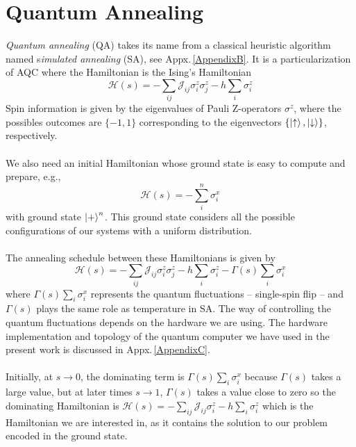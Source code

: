 \section{Quantum Annealing}
\textit{Quantum annealing} (QA) takes its name from a classical heuristic algorithm named s\textit{imulated annealing} (SA), see Appx.\,\ref{AppendixB}. It is a particularization of AQC where the Hamiltonian is the Ising's Hamiltonian
\begin{equation}
    \mathcal{H}(s) = -\sum_{ij}\mathcal{J}_{ij}\sigma_{i}^{z}\sigma_{j}^{z} - h\sum_{i}\sigma_{i}^{z}
\end{equation}
Spin information is given by the eigenvalues of Pauli Z-operators $\sigma^{z}$, where the possibles outcomes are $\{-1,1\}$ corresponding to the eigenvectors $\{\ket{\uparrow},\ket{\downarrow}\}$, respectively.\\\\
We also need an initial Hamiltonian whose ground state is easy to compute and prepare, e.g.,
\begin{equation}
    \mathcal{H}(s) = -\sum_{i}^{n}\sigma_{i}^{x}
\end{equation}
with ground state $\ket{+}^{n}$. This ground state considers all the possible configurations of our systems with a uniform distribution.\\\\
The annealing schedule between these Hamiltonians is given by
\begin{equation}
    \mathcal{H}(s) = -\sum_{ij}\mathcal{J}_{ij}\sigma_{i}^{z}\sigma_{j}^{z} - h\sum_{i}\sigma_{i}^{z} - \Gamma(s)\sum_{i}\sigma_{i}^{x}
\end{equation}
where $\Gamma(s)\sum_{i}\sigma_{i}^{x}$ represents the quantum fluctuations -- single-spin flip -- and $\Gamma(s)$ plays the same role as temperature in SA. The way of controlling the quantum fluctuations depends on the hardware we are using. The hardware implementation and topology of the quantum computer we have used in the present work is discussed in Appx.\,\ref{AppendixC}.\\\\
Initially, at $s \rightarrow 0$, the dominating term is $\Gamma(s)\sum_{i}\sigma_{i}^{x}$ because $\Gamma(s)$ takes a large value, but at later times $s \rightarrow 1$, $\Gamma(s)$ takes a value close to zero so the dominating Hamiltonian is $\mathcal{H}(s) = -\sum_{ij}\mathcal{J}_{ij}\sigma_{i}^{z} - h\sum_{i}\sigma_{i}^{z}$ which is the Hamiltonian we are interested in, as it contains the solution to our problem encoded in the ground state.
